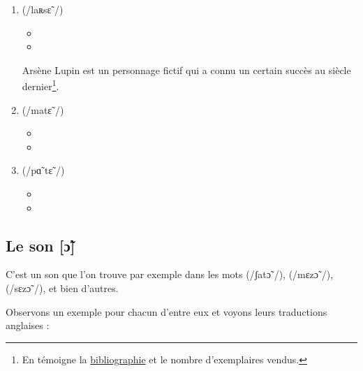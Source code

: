 \begin{enumerate}
\item {} (/laʀsɛ̃ /)
  \begin{itemize}
  \item {}
    \item {}
    \end{itemize}
    Arsène Lupin est un personnage fictif qui a connu un certain
    succès au siècle dernier\footnote{En témoigne la
      \href{https://www.amazon.fr/gp/product/B01N7I8WHS/ref=as_li_tl?ie=UTF8&camp=1642&creative=6746&creativeASIN=B01N7I8WHS&linkCode=as2&tag=wwwbecomefree-21&linkId=b8a42c0dbe0bb02385db28679d7e46fd}{bibliographie}
      et le nombre d'exemplaires vendus.}.
\item {} (/matɛ̃ /)
  \begin{itemize}
  \item {}
  \item {}
  \end{itemize}
\item {} (/pɑ̃ tɛ̃ /)
  \begin{itemize}
  \item {}
  \item {}
  \end{itemize}
\end{enumerate}         

\subsection{Le son [ɔ̃]}\label{subsec:ctfr}
C'est un son que l'on trouve par exemple dans les mots
 (/ʃatɔ̃ /),  (/mɛzɔ̃ /),  (/sɛzɔ̃ /), et bien d'autres.

Observons un exemple pour chacun d'entre eux et voyons leurs
traductions anglaises :\par

